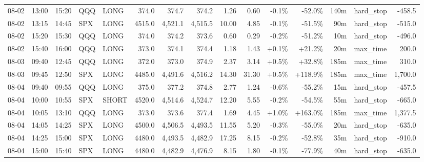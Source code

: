 \documentclass[11pt,a4paper,twoside]{article}
\begin{document}
\begin{landscape}
\begin{center}
\begin{longtable}{>{\color{txtmain}}l l l l l r r r r r r r r >{\color{txtmain}}l r}
08-02 & 13:00 & 15:20 & QQQ & LONG & 374.0 & 374.7 & 374.2 & 1.26 & 0.60 & \textcolor{lossred}{-0.1\%} & \textcolor{lossred}{-52.0\%} & 140m & hard\_stop & \textcolor{lossred}{-458.5} \\
08-02 & 13:15 & 14:45 & SPX & LONG & 4515.0 & 4,521.1 & 4,515.5 & 10.00 & 4.85 & \textcolor{lossred}{-0.1\%} & \textcolor{lossred}{-51.5\%} & 90m & hard\_stop & \textcolor{lossred}{-515.0} \\
08-02 & 15:20 & 15:30 & QQQ & LONG & 374.0 & 374.2 & 373.6 & 0.60 & 0.29 & \textcolor{lossred}{-0.2\%} & \textcolor{lossred}{-51.2\%} & 10m & hard\_stop & \textcolor{lossred}{-496.0} \\
08-02 & 15:40 & 16:00 & QQQ & LONG & 373.0 & 374.1 & 374.4 & 1.18 & 1.43 & \textcolor{wingreen}{+0.1\%} & \textcolor{wingreen}{+21.2\%} & 20m & max\_time & \textcolor{wingreen}{200.0} \\
08-03 & 09:40 & 12:45 & QQQ & LONG & 372.0 & 373.0 & 374.9 & 2.37 & 3.14 & \textcolor{wingreen}{+0.5\%} & \textcolor{wingreen}{+32.8\%} & 185m & max\_time & \textcolor{wingreen}{310.0} \\
08-03 & 09:45 & 12:50 & SPX & LONG & 4485.0 & 4,491.6 & 4,516.2 & 14.30 & 31.30 & \textcolor{wingreen}{+0.5\%} & \textcolor{wingreen}{+118.9\%} & 185m & max\_time & \textcolor{wingreen}{1,700.0} \\
08-04 & 09:40 & 09:55 & QQQ & LONG & 375.0 & 377.2 & 374.8 & 2.77 & 1.24 & \textcolor{lossred}{-0.6\%} & \textcolor{lossred}{-55.2\%} & 15m & hard\_stop & \textcolor{lossred}{-457.5} \\
08-04 & 10:00 & 10:55 & SPX & SHORT & 4520.0 & 4,514.6 & 4,524.7 & 12.20 & 5.55 & \textcolor{lossred}{-0.2\%} & \textcolor{lossred}{-54.5\%} & 55m & hard\_stop & \textcolor{lossred}{-665.0} \\
08-04 & 10:05 & 13:10 & QQQ & LONG & 373.0 & 373.6 & 377.4 & 1.69 & 4.45 & \textcolor{wingreen}{+1.0\%} & \textcolor{wingreen}{+163.0\%} & 185m & max\_time & \textcolor{wingreen}{1,377.5} \\
08-04 & 14:05 & 14:25 & SPX & LONG & 4500.0 & 4,506.5 & 4,493.5 & 11.55 & 5.20 & \textcolor{lossred}{-0.3\%} & \textcolor{lossred}{-55.0\%} & 20m & hard\_stop & \textcolor{lossred}{-635.0} \\
08-04 & 14:25 & 15:00 & SPX & LONG & 4480.0 & 4,493.5 & 4,482.9 & 17.25 & 8.15 & \textcolor{lossred}{-0.2\%} & \textcolor{lossred}{-52.8\%} & 35m & hard\_stop & \textcolor{lossred}{-910.0} \\
08-04 & 15:00 & 15:40 & SPX & LONG & 4480.0 & 4,482.9 & 4,476.9 & 8.15 & 1.80 & \textcolor{lossred}{-0.1\%} & \textcolor{lossred}{-77.9\%} & 40m & hard\_stop & \textcolor{lossred}{-635.0} \\

\end{longtable}
\end{center}
\end{landscape}
\end{document}
